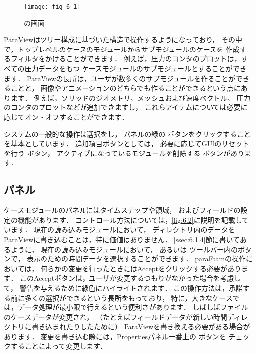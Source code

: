 \begin{figure}[ht]
 \texttt{[image: fig-6-1]}
 \caption{の画面}
 \label{fig:6.1}
\end{figure}


ParaViewはツリー構成に基づいた構造で操作するようになっており，
その中で，トップレベルのケースのモジュールからサブモジュールのケースを
作成するフィルタをかけることができます．
例えば，圧力のコンタのプロットは，すべての圧力データをもつ
ケースモジュールのサブモジュールとすることができます．
ParaViewの長所は，ユーザが数多くのサブモジュールを作ることができることと，
画像やアニメーションのどちらでも作ることができるという点にあります．
例えば，ソリッドのジオメトリ，メッシュおよび速度ベクトル，
圧力のコンタのプロットなどが追加できますし，
これらアイテムについては必要に応じてオン・オフすることができます．

システムの一般的な操作は選択をし，
パネルの緑の
%
%
ボタンをクリックすることを基本としています．
追加項目ボタンとしては，
必要に応じてGUIのリセットを行う
%
%
ボタン，
アクティブになっているモジュールを削除する
%
%
ボタンがあります．


\subsection{パネル}
\label{ssec:6.1.2}
ケースモジュールのパネルにはタイムステップや領域，
およびフィールドの設定の機能があります．
コントロール方法については，\autoref{fig:6.2}に説明を記載しています．
現在の読み込みモジュールにおいて，
ディレクトリ内のデータをParaViewに書き込むことは，特に価値はありません．
\autoref{ssec:6.1.4}節に書いてあるように，
現在の読み込みモジュールにおいて，
%
%
あるいは
%
%
ツールバー内のボタンで，
表示のための時間データを選択することができます．
paraFoamの操作においては，
何らかの変更を行ったときにはAcceptをクリックする必要があります．
このAcceptボタンは，ユーザが変更するつもりがなかった場合を考慮して，
警告を与えるために緑色にハイライトされます．
この操作方法は，承諾する前に多くの選択ができるという長所をもっており，
特に，大きなケースでは，データ処理が最小限で行えるという便利さがあります．
しばしばファイルのケースデータが変更され，
（たとえばフィールドデータが新しい時間ディレクトリに書き込まれたりしたために）
ParaViewを書き換える必要がある場合があります．
変更を書き込む際には，Propertiesパネル一番上の
%
%
ボタンを
チェックすることによって変更します．


